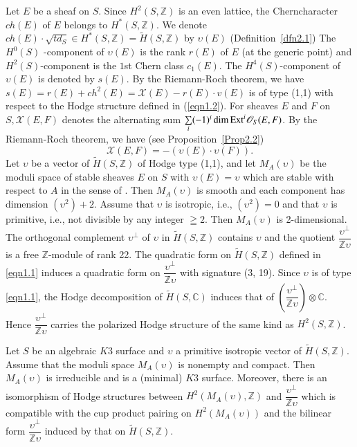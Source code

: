 Let $E$ be a sheaf on $S$. Since $H^{2}(S,\mathbb{Z})$ is an even
lattice, the Chern\pageoriginale character $ch(E)$ of $E$ belongs to
$H^{\ast}(S,\mathbb{Z})$. We denote $ch(E)\cdot \sqrt{td_S}\in
H^{\ast}(S,\mathbb{Z})=\widetilde{H}(S,\mathbb{Z})$ by $\upsilon(E)$
(Definition~\ref{dfn2.1}) The $H^{0}(S)$ -component of $\upsilon(E)$ is the
rank $r(E)$ of $E$ (at the generic point) and $H^{2}(S)$-component is
the $1$st Chern class $c_1(E)$. The $H^{4}(S)$-component of $\upsilon(E)$ is
denoted by $s(E)$. By the Riemann-Roch theorem, we have
$s(E)=r(E)+ch^{2}(E)=\mathcal{X}(E)-r(E)\cdot v(E)$ is of type (1,1)
with respect to the Hodge structure defined in (\ref{eqn1.2}). For
sheaves $E$ and $F$ on $S,\mathcal{X}(E,F)$ denotes the alternating
sum $\sum\limits_{i}(-1)^{i}\dim \mathrm{Ext}^{i}\mathscr{O}_S(E,F)$. By the
Riemann-Roch theorem, we have (see Proposition~\ref{Prop2.2})
$$
\mathcal{X}(E,F)=-(\upsilon(E)\cdot \upsilon(F)).
$$
Let $\upsilon$ be a vector of $\widetilde{H}(S,\mathbb{Z})$ of Hodge type
(1,1), and let $M_A(\upsilon)$ be the moduli space of stable sheaves $E$ on
$S$ with $\upsilon(E)=\upsilon$ which are stable with respect to $A$ in the
sense of \cite{key2}. Then $M_A(\upsilon)$ is smooth and each component has
dimension $(\upsilon^{2})+2$. Assume that $\upsilon$ is isotropic, i.e.,
$(\upsilon^{2})=0$ and that $\upsilon$ is primitive, i.e., not divisible by any
integer $\geqq 2$. Then $M_A(\upsilon)$ is 2-dimensional. The orthogonal
complement $\upsilon^{\perp}$ of $\upsilon$ in $\widetilde{H}(S,\mathbb{Z})$ contains $\upsilon$
and the quotient $\dfrac{\upsilon^{\perp}}{\mathbb{Z} \upsilon}$ is a free
$\mathbb{Z}$-module of rank 22. The quadratic form on
$\widetilde{H}(S,\mathbb{Z})$ defined in \eqref{eqn1.1} induces a
quadratic form on $\dfrac{\upsilon^{\perp}}{\mathbb{Z}\upsilon}$ with signature
(3, 19). Since $\upsilon$ is of type \eqref{eqn1.1}, the Hodge
decomposition of $\widetilde{H}(S,\mathbb{C})$ induces that of
$\left(\dfrac{\upsilon^{\perp}}{\mathbb{Z}\upsilon}\right)\otimes
\mathbb{C}$. Hence $\dfrac{\upsilon^{\perp}}{\mathbb{Z}\upsilon}$ carries the
polarized Hodge structure of the same kind as $H^{2}(S,\mathbb{Z})$. 


\setcounter{dfn}{3}
\begin{Theorem}\label{Theorem1.4}
Let $S$ be an algebraic $K3$ surface and $\upsilon$ a primitive isotropic
vector of $\widetilde{H}(S,\mathbb{Z})$. Assume that the moduli space\pageoriginale
$M_A(\upsilon)$ is nonempty and compact. Then $M_A(\upsilon)$ is
irreducible and is a (minimal) $K3$ surface. Moreover, there is an
isomorphism of Hodge structures between
$H^{2}(M_A(\upsilon),\mathbb{Z})$ and
$\dfrac{\upsilon^{\perp}}{\mathbb{Z}\upsilon}$ which is compatible
with the cup product pairing on $H^{2}(M_A(\upsilon))$ and the
bilinear form $\dfrac{\upsilon^{\perp}}{\mathbb{Z}\upsilon}$ induced
by that on $\widetilde{H}(S,\mathbb{Z})$. 
\end{Theorem}

